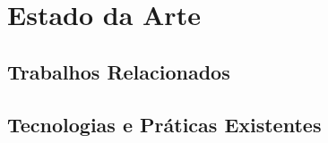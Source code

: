 \chapter{Estado da Arte}
\label{cap:estado_da_arte}


\section{Trabalhos Relacionados}
\label{sec:trabalhos_relacionados}

%
%
%

\section{Tecnologias e Práticas Existentes}
\label{sec:tecnologias_existentes}

